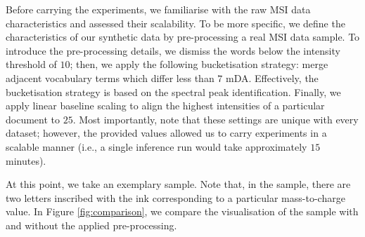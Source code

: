 \documentclass{mpaper}
\begin{document}

\par Before carrying the experiments, we familiarise with the raw MSI data characteristics and assessed their scalability. To be more specific, we define the characteristics of our synthetic data by pre-processing a real MSI data sample. To introduce the pre-processing details, we dismiss the words below the intensity threshold of $10$; then, we apply the following bucketisation strategy: merge adjacent vocabulary terms which differ less than $7$ mDA. Effectively, the bucketisation strategy is based on the spectral peak identification. Finally, we apply linear baseline scaling to align the highest intensities of a particular document to $25$. Most importantly, note that these settings are unique with every dataset; however, the provided values allowed us to carry experiments in a scalable manner (i.e., a single inference run would take approximately $15$ minutes).

\par At this point, we take an exemplary sample. Note that, in the sample, there are two letters inscribed with the ink corresponding to a particular mass-to-charge value. In Figure \ref{fig:comparison}, we compare the visualisation of the sample with and without the applied pre-processing.
\end{document}
